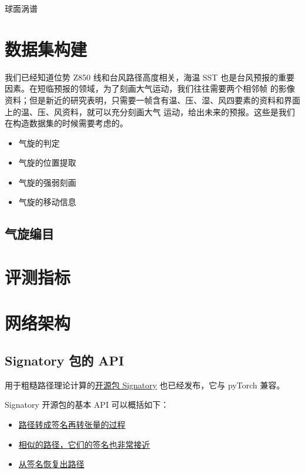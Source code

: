 \documentclass[11pt]{article}
\begin{document}
球面涡谱

\newpage

\section{数据集构建}

我们已经知道位势 Z850 线和台风路径高度相关，海温 SST 也是台风预报的重要因素。在短临预报的领域，为了刻画大气运动，我们往往需要两个相邻帧
的影像资料；但是新近的研究表明\cite{Bi2022Pangu}，只需要一帧含有温、压、湿、风四要素的资料和界面上的温、压、风资料，就可以充分刻画大气
运动，给出未来的预报。这些是我们在构造数据集的时候需要考虑的。

\begin{itemize}
    \item 气旋的判定
    \item 气旋的位置提取
    \item 气旋的强弱刻画
    \item 气旋的移动信息
\end{itemize}


\subsection{气旋编目}

\newpage

\section{评测指标}

\newpage

\section{网络架构}

\subsection{Signatory 包的 API}

用于粗糙路径理论计算的\href{https://github.com/patrick-kidger/signatory}{开源包 Signatory} 也已经发布，它与 pyTorch 兼容。

Signatory 开源包的基本 API 可以概括如下：
\begin{itemize}
\item \href{https://signatory.readthedocs.io/en/latest/pages/examples/neuralnetworks.html}{路径转成签名再转张量的过程}
\item \href{https://signatory.readthedocs.io/en/latest/pages/examples/translation.html}{相似的路径，它们的签名也非常接近}
\item \href{https://signatory.readthedocs.io/en/latest/pages/examples/inversion.html}{从签名恢复出路径}
\end{itemize}
\end{document}
